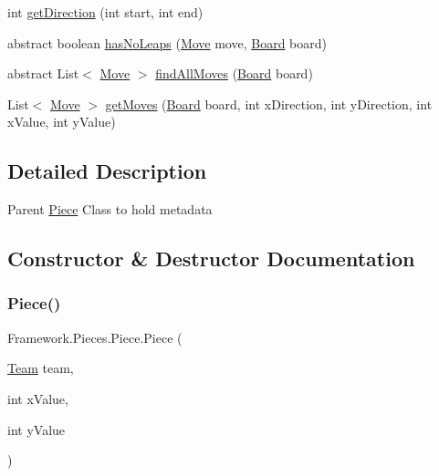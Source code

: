 \begin{DoxyCompactItemize}
\item 
int \hyperlink{class_framework_1_1_pieces_1_1_piece_ac9f72701fd35b1bef9ea3e42f648936b}{get\+Direction} (int start, int end)
\item 
abstract boolean \hyperlink{class_framework_1_1_pieces_1_1_piece_a6a7d6f6cf39ebc83927c5f3912163191}{has\+No\+Leaps} (\hyperlink{class_framework_1_1_move}{Move} move, \hyperlink{class_framework_1_1_board}{Board} board)
\item 
abstract List$<$ \hyperlink{class_framework_1_1_move}{Move} $>$ \hyperlink{class_framework_1_1_pieces_1_1_piece_a1572fe9000efc0a075e143dea8cba7c2}{find\+All\+Moves} (\hyperlink{class_framework_1_1_board}{Board} board)
\item 
List$<$ \hyperlink{class_framework_1_1_move}{Move} $>$ \hyperlink{class_framework_1_1_pieces_1_1_piece_a40e63d34544fb609fa5380b5d1664353}{get\+Moves} (\hyperlink{class_framework_1_1_board}{Board} board, int x\+Direction, int y\+Direction, int x\+Value, int y\+Value)
\end{DoxyCompactItemize}


\subsection{Detailed Description}
Parent \hyperlink{class_framework_1_1_pieces_1_1_piece}{Piece} Class to hold metadata 

\subsection{Constructor \& Destructor Documentation}
\hypertarget{class_framework_1_1_pieces_1_1_piece_a799b53db9458526b312ab23ac7f10700}{}\label{class_framework_1_1_pieces_1_1_piece_a799b53db9458526b312ab23ac7f10700} 
\subsubsection{\texorpdfstring{Piece()}{Piece()}}
{\footnotesize\ttfamily Framework.\+Pieces.\+Piece.\+Piece (\begin{DoxyParamCaption}\item[{\hyperlink{class_framework_1_1_team}{Team}}]{team,  }\item[{int}]{x\+Value,  }\item[{int}]{y\+Value }\end{DoxyParamCaption})}

